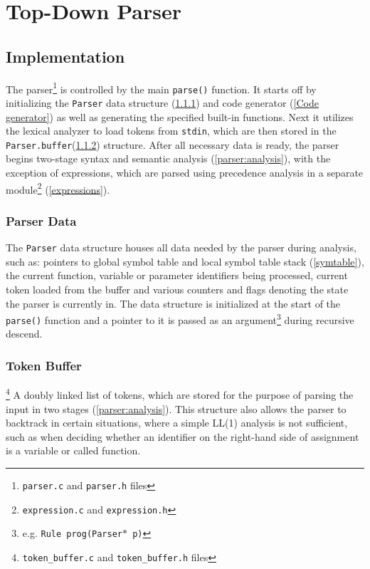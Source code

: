 \section{Top-Down Parser}
\label{parser:head}


\subsection{Implementation} 
\label{parser:implementation}
The parser\footnote{\texttt{parser.c} and \texttt{parser.h} files} is controlled by the main \texttt{parse()} function. It starts off by initializing the \texttt{Parser} data structure (\ref{parser:datastruct}) and code generator (\ref{Code generator}) as well as generating the specified built-in functions. Next it utilizes the lexical analyzer to load tokens from \texttt{stdin}, which are then stored in the \texttt{Parser.buffer}(\ref{parser:tokenbuf}) structure. After all necessary data is ready, the parser begins two-stage syntax and semantic analysis (\ref{parser:analysis}), with the exception of expressions, which are parsed using precedence analysis in a separate module\footnote{\texttt{expression.c} and \texttt{expression.h}} (\ref{expressions}).

\subsubsection{Parser Data} 
\label{parser:datastruct}
The \texttt{Parser} data structure houses all data needed by the parser during analysis, such as: pointers to global symbol table and local symbol table stack (\ref{symtable}), the current function, variable or parameter identifiers being processed, current token loaded from the buffer and various counters and flags denoting
the state the parser is currently in. The data structure is initialized at the start of the \texttt{parse()} function and a pointer to it is passed as an argument\footnote{e.g. \texttt{Rule prog(Parser$*$ p)}} during recursive descend.

\subsubsection{Token Buffer}
\label{parser:tokenbuf}
\footnote{\texttt{token\_buffer.c} and \texttt{token\_buffer.h} files} 
A doubly linked list of tokens, which are stored for the purpose of parsing the input in two stages (\ref{parser:analysis}). This structure also allows the parser to backtrack in certain situations, where a simple LL(1) analysis is not sufficient, such as when deciding whether an identifier on the right-hand side of assignment is a variable or called function.

